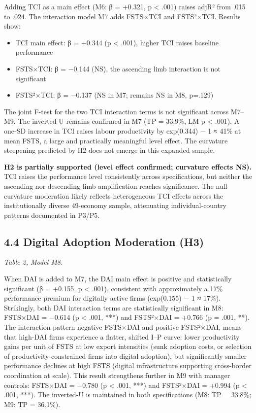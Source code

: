\documentclass[
  12pt]{article}
\providecommand{\tightlist}{%
  \setlength{\itemsep}{0pt}\setlength{\parskip}{0pt}}
\begin{document}
Adding TCI as a main effect (M6: β = +0.321, p \textless{} .001) raises
adjR² from .015 to .024. The interaction model M7 adds FSTS×TCI and
FSTS²×TCI. Results show:

\begin{itemize}
\tightlist
\item
  TCI main effect: β = +0.344 (p \textless{} .001), higher TCI raises
  baseline performance
\item
  FSTS×TCI: β = −0.144 (NS), the ascending limb interaction is not
  significant
\item
  FSTS²×TCI: β = −0.137 (NS in M7; remains NS in M8, p=.129)
\end{itemize}

The joint F-test for the two TCI interaction terms is not significant
across M7--M9. The inverted-U remains confirmed in M7 (TP = 33.9\%, LM p
\textless{} .001). A one-SD increase in TCI raises labour productivity
by exp(0.344) − 1 ≈ 41\% at mean FSTS, a large and practically
meaningful level effect. The curvature steepening predicted by H2 does
not emerge in this expanded sample.

\textbf{H2 is partially supported (level effect confirmed; curvature
effects NS).} TCI raises the performance level consistently across
specifications, but neither the ascending nor descending limb
amplification reaches significance. The null curvature moderation likely
reflects heterogeneous TCI effects across the institutionally diverse
49-economy sample, attenuating individual-country patterns documented in
P3/P5.

\hypertarget{digital-adoption-moderation-h3}{%
\subsection{4.4 Digital Adoption Moderation
(H3)}\label{digital-adoption-moderation-h3}}

\emph{Table 2, Model M8.}

When DAI is added to M7, the DAI main effect is positive and
statistically significant (β = +0.155, p \textless{} .001), consistent
with approximately a 17\% performance premium for digitally active firms
(exp(0.155) − 1 ≈ 17\%). Strikingly, both DAI interaction terms are
statistically significant in M8: FSTS×DAI = −0.614 (p \textless{} .001,
***) and FSTS²×DAI = +0.766 (p = .001, **). The interaction pattern
negative FSTS×DAI and positive FSTS²×DAI, means that high-DAI firms
experience a flatter, shifted I--P curve: lower productivity gains per
unit of FSTS at low export intensities (sunk adoption costs, or
selection of productivity-constrained firms into digital adoption), but
significantly smaller performance declines at high FSTS (digital
infrastructure supporting cross-border coordination at scale). This
result strengthens further in M9 with manager controls: FSTS×DAI =
−0.780 (p \textless{} .001, ***) and FSTS²×DAI = +0.994 (p \textless{}
.001, ***). The inverted-U is maintained in both specifications (M8: TP
= 33.8\%; M9: TP = 36.1\%).
\end{document}
